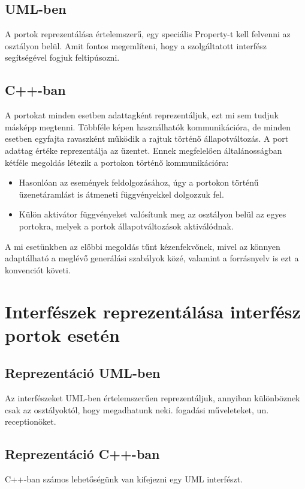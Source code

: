 \documentclass[a4paper,12pt]{report}
\begin{document}
\subsection{UML-ben}
A portok reprezentálása értelemszerű, egy speciális Property-t kell felvenni az osztályon belül. Amit fontos megemlíteni, hogy a szolgáltatott interfész segítségével fogjuk feltipúsozni. 

\subsection{C++-ban}
A portokat minden esetben adattagként reprezentáljuk, ezt mi sem tudjuk másképp megtenni. Többféle képen használhatók kommunikációra, de minden esetben egyfajta ravaszként működik a rajtuk történő állapotváltozás. A port adattag értéke reprezentálja az üzentet. Ennek megfelelően általánosságban kétféle megoldás létezik a portokon történő kommunikációra:
\begin{itemize}
\item Hasonlóan az események feldolgozásához, úgy a portokon történű üzenetáramlást is átmeneti függvényekkel dolgozzuk fel.
\item Külön aktivátor függvényeket valósítunk meg az osztályon belül az egyes portokra, melyek a portok állapotváltozások aktiválódnak. 
\end{itemize}

A mi esetünkben az előbbi megoldás tűnt kézenfekvőnek, mivel az könnyen adaptálható a meglévő generálási szabályok közé, valamint a forrásnyelv is ezt a konvenciót követi. 

\section{Interfészek reprezentálása interfész portok esetén}
\subsection{Reprezentáció UML-ben}
Az interfészeket UML-ben értelemszerűen reprezentáljuk, annyiban különböznek csak az osztályoktól, hogy megadhatunk neki. fogadási műveleteket, un. receptionöket.

\subsection{Reprezentáció C++-ban}
C++-ban számos lehetőségünk van kifejezni egy UML interfészt.
\end{document}
